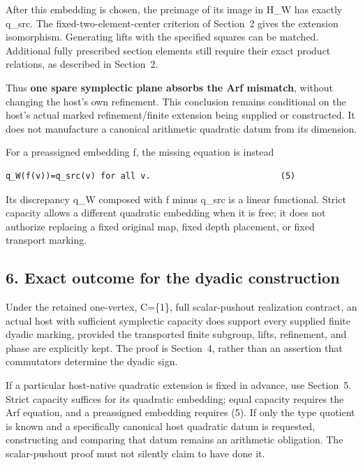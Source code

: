 After this embedding is chosen, the preimage of its image in H\_W has
exactly q\_src. The fixed-two-element-center criterion of Section~2 gives
the extension isomorphism. Generating lifts with the specified squares
can be matched. Additional fully prescribed section elements still
require their exact product relations, as described in Section~2.

Thus \textbf{one spare symplectic plane absorbs the Arf mismatch},
without changing the host's own refinement. This conclusion remains
conditional on the host's actual marked refinement/finite extension
being supplied or constructed. It does not manufacture a canonical
arithmetic quadratic datum from its dimension.

For a preassigned embedding f, the missing equation is instead

\begin{Verbatim}[fontsize=\small,breaklines=true,breakanywhere=true]
q_W(f(v))=q_src(v) for all v.                          (5)
\end{Verbatim}

Its discrepancy q\_W composed with f minus q\_src is a linear
functional. Strict capacity allows a different quadratic embedding when
it is free; it does not authorize replacing a fixed original map, fixed
depth placement, or fixed transport marking.

\hypertarget{dyadic_markings-exact-outcome-for-the-dyadic-construction}{%
\subsection{6. Exact outcome for the dyadic
construction}\label{dyadic_markings-exact-outcome-for-the-dyadic-construction}}

Under the retained one-vertex, C=\{1\}, full scalar-pushout realization
contract, an actual host with sufficient symplectic capacity does
support every supplied finite dyadic marking, provided the transported
finite subgroup, lifts, refinement, and phase are explicitly kept. The
proof is Section~4, rather than an assertion that commutators determine
the dyadic sign.

If a particular host-native quadratic extension is fixed in advance, use
Section~5. Strict capacity suffices for its quadratic embedding; equal
capacity requires the Arf equation, and a preassigned embedding requires
(5). If only the type quotient is known and a specifically canonical
host quadratic datum is requested, constructing and comparing that datum
remains an arithmetic obligation. The scalar-pushout proof must not
silently claim to have done it.

